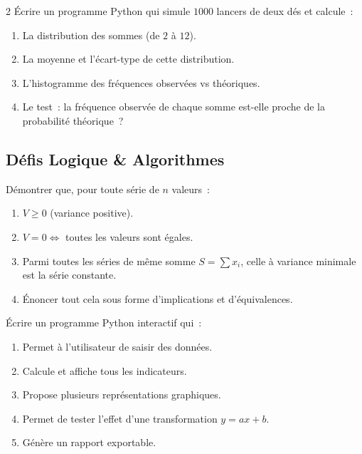 \begin{bilan}
\begin{probleme}{2}
\'Ecrire un programme Python qui simule $1000$ lancers de deux d\'es
et calcule~:
\begin{enumerate}
  \item La distribution des sommes (de $2$ \`a $12$).
  \item La moyenne et l'\'ecart-type de cette distribution.
  \item L'histogramme des fr\'equences observ\'ees vs th\'eoriques.
  \item Le test~: la fr\'equence observ\'ee de chaque somme est-elle
        proche de la probabilit\'e th\'eorique~?
\end{enumerate}
\end{probleme}

\subsection*{D\'efis Logique \& Algorithmes}

\begin{challenge}
D\'emontrer que, pour toute s\'erie de $n$ valeurs~:
\begin{enumerate}
  \item $V\geq0$ (variance positive).
  \item $V=0 \Leftrightarrow$ toutes les valeurs sont \'egales.
  \item Parmi toutes les s\'eries de m\^eme somme $S=\sum x_i$, celle \`a variance
        minimale est la s\'erie constante.
  \item \'Enoncer tout cela sous forme d'implications et d'\'equivalences.
\end{enumerate}
\end{challenge}

\begin{challenge}
\'Ecrire un programme Python interactif qui~:
\begin{enumerate}
  \item Permet \`a l'utilisateur de saisir des donn\'ees.
  \item Calcule et affiche tous les indicateurs.
  \item Propose plusieurs repr\'esentations graphiques.
  \item Permet de tester l'effet d'une transformation $y=ax+b$.
  \item G\'en\`ere un rapport exportable.
\end{enumerate}
\end{challenge}

\end{bilan}


\backmatter
